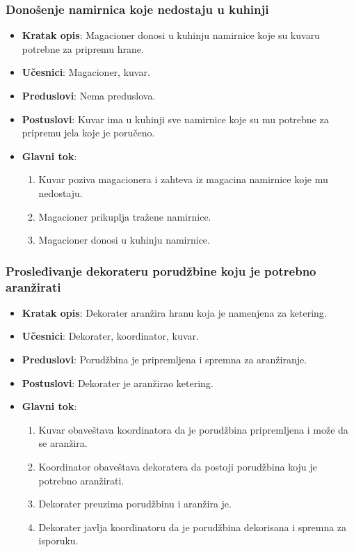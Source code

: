 \subsubsection{Donošenje namirnica koje nedostaju u kuhinji}
\begin{itemize}
    \item \textbf{Kratak opis}:
    Magacioner donosi u kuhinju namirnice koje su kuvaru potrebne za pripremu hrane.
    \item \textbf{Učesnici}:
    Magacioner, kuvar.
    \item \textbf{Preduslovi}:
    Nema preduslova.
    \item \textbf{Postuslovi}:
    Kuvar ima u kuhinji sve namirnice koje su mu potrebne za pripremu jela koje je poručeno.
    \item \textbf{Glavni tok}:
   \begin{enumerate}
        \item Kuvar poziva magacionera i zahteva iz magacina namirnice koje mu nedostaju.
        \item Magacioner prikuplja tražene namirnice.
        \item Magacioner donosi u kuhinju namirnice.
\end{enumerate}
\end{itemize}

\subsubsection{Prosleđivanje dekorateru porudžbine koju je potrebno aranžirati}
\begin{itemize}
    \item \textbf{Kratak opis}:
    Dekorater aranžira hranu koja je
    namenjena za ketering.
    \item \textbf{Učesnici}: 
    Dekorater, koordinator, kuvar.
    \item \textbf{Preduslovi}:
    Porudžbina je pripremljena i spremna
    za aranžiranje.
    \item \textbf{Postuslovi}:
    Dekorater je aranžirao ketering.
    \item \textbf{Glavni tok}:
   \begin{enumerate}
        \item Kuvar obaveštava koordinatora da
        je porudžbina pripremljena i može da 
        se aranžira.
        \item Koordinator obaveštava
        dekoratera da postoji porudžbina koju je potrebno aranžirati.
        \item Dekorater preuzima porudžbinu i aranžira je.
        \item Dekorater javlja koordinatoru da 
        je porudžbina dekorisana i spremna za isporuku.
\end{enumerate}
\end{itemize}

